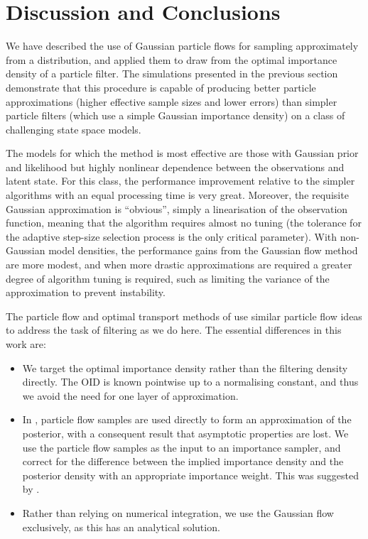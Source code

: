 \documentclass{article}
\begin{document}
\section{Discussion and Conclusions}

We have described the use of Gaussian particle flows for sampling approximately from a distribution, and applied them to draw from the optimal importance density of a particle filter. The simulations presented in the previous section demonstrate that this procedure is capable of producing better particle approximations (higher effective sample sizes and lower errors) than simpler particle filters (which use a simple Gaussian importance density) on a class of challenging state space models.

The models for which the method is most effective are those with Gaussian prior and likelihood but highly nonlinear dependence between the observations and latent state. For this class, the performance improvement relative to the simpler algorithms with an equal processing time is very great. Moreover, the requisite Gaussian approximation is ``obvious'', simply a linearisation of the observation function, meaning that the algorithm requires almost no tuning (the tolerance for the adaptive step-size selection process is the only critical parameter). With non-Gaussian model densities, the performance gains from the Gaussian flow method are more modest, and when more drastic approximations are required a greater degree of algorithm tuning is required, such as limiting the variance of the approximation to prevent instability.

The particle flow and optimal transport methods of \citep{Daum2008,Daum2011d,Reich2011,Reich2012a} use similar particle flow ideas to address the task of filtering as we do here. The essential differences in this work are:
%
\begin{itemize}
  \item We target the optimal importance density rather than the filtering density directly. The OID is known pointwise up to a normalising constant, and thus we avoid the need for one layer of approximation.
  \item In \citep{Daum2008,Daum2011d,Reich2011,Reich2012a}, particle flow samples are used directly to form an approximation of the posterior, with a consequent result that asymptotic properties are lost. We use the particle flow samples as the input to an importance sampler, and correct for the difference between the implied importance density and the posterior density with an appropriate importance weight. This was suggested by \cite{Reich2012}.
  \item Rather than relying on numerical integration, we use the Gaussian flow exclusively, as this has an analytical solution.
\end{itemize}
\end{document}
